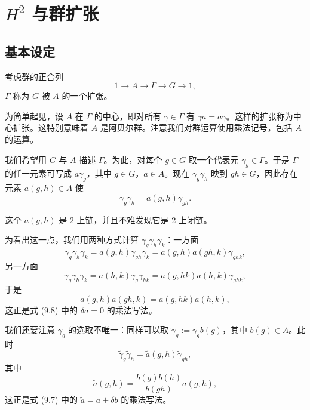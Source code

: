 \section{$H^2$ 与群扩张}

\subsection{基本设定}

考虑群的正合列
\begin{equation}
  1\to A\to\Gamma\to G\to 1,
  \tag{9.10}
\end{equation}
$\Gamma$ 称为 $G$ 被 $A$ 的一个扩张。

为简单起见，设 $A$ 在 $\Gamma$ 的中心，即对所有 $\gamma\in\Gamma$ 有 $\gamma a=a\gamma$。这样的扩张称为中心扩张。这特别意味着 $A$ 是阿贝尔群。注意我们对群运算使用乘法记号，包括 $A$ 的运算。

我们希望用 $G$ 与 $A$ 描述 $\Gamma$。为此，对每个 $g\in G$ 取一个代表元 $\gamma_g\in\Gamma$。于是 $\Gamma$ 的任一元素可写成 $a\gamma_g$，其中 $g\in G$，$a\in A$。现在 $\gamma_g\gamma_h$ 映到 $gh\in G$，因此存在元素 $a(g,h)\in A$ 使
\begin{equation}
  \gamma_g\gamma_h=a(g,h)\gamma_{gh}.
  \tag{9.11}
\end{equation}

这个 $a(g,h)$ 是 2-上链，并且不难发现它是 2-上闭链。

为看出这一点，我们用两种方式计算 $\gamma_g\gamma_h\gamma_k$：一方面
\begin{equation}
  \gamma_g\gamma_h\gamma_k=a(g,h)\gamma_{gh}\gamma_k=a(g,h)a(gh,k)\gamma_{ghk},
  \tag{9.12}
\end{equation}
另一方面
\begin{equation}
  \gamma_g\gamma_h\gamma_k=a(h,k)\gamma_g\gamma_{hk}=a(g,hk)a(h,k)\gamma_{ghk},
  \tag{9.13}
\end{equation}
于是
\begin{equation}
  a(g,h)a(gh,k)=a(g,hk)a(h,k),
  \tag{9.14}
\end{equation}
这正是式 (9.8) 中的 $\delta a=0$ 的乘法写法。

我们还要注意 $\gamma_g$ 的选取不唯一：同样可以取 $\tilde\gamma_g:=\gamma_gb(g)$，其中 $b(g)\in A$。此时
\[
  \tilde\gamma_g\tilde\gamma_h=\tilde a(g,h)\tilde\gamma_{gh},
\]
其中
\begin{equation}
  \tilde a(g,h)=\frac{b(g)b(h)}{b(gh)}a(g,h),
  \tag{9.15}
\end{equation}
这正是式 (9.7) 中的 $\tilde a=a+\delta b$ 的乘法写法。

